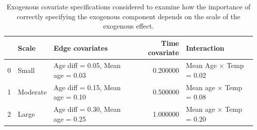 \begin{table}
\caption{Exogenous covariate specifications considered to examine how the importance of correctly specifying the exogenous component depends on the scale of the exogenous effect.}
\begin{tabular}{lllrl}
\toprule
 & Scale & Edge covariates & Time covariate & Interaction \\
\midrule
0 & Small & Age diff = 0.05, Mean age = 0.03 & 0.200000 & Mean Age × Temp = 0.02 \\
1 & Moderate & Age diff = 0.15, Mean age = 0.10 & 0.500000 & Mean age × Temp = 0.08 \\
2 & Large & Age diff = 0.30, Mean age = 0.25 & 1.000000 & Mean age × Temp = 0.20 \\
\bottomrule
\end{tabular}
\end{table}
